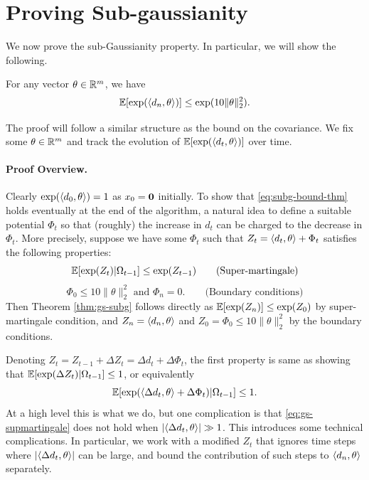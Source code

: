 \section{Proving Sub-gaussianity}

\label{sec:gs-subgaussian}
We now prove the sub-Gaussianity property. In particular, we will show the following.
\begin{theorem}
\label{thm:gs-subg}
For any vector
$\theta \in \mathbb{R}^m$, we have 
\begin{equation}
\label{eq:subg-bound-thm}
    \mathbb{E}[\exp(\langle d_n,\theta\rangle)] \leq \exp(10 \|\theta\|_2^2).
\end{equation}
\end{theorem}


The proof will follow a similar structure as the bound on the covariance. We fix some $\theta \in \mathbb{R}^m$ and track the evolution of $\mathbb{E}[\exp(\langle d_t,\theta\rangle)]$ over time.   

\paragraph{Proof Overview.}
Clearly $\exp(\langle d_0,\theta\rangle)=1$ as $x_0 = \bf{0}$ initially. To show that \eqref{eq:subg-bound-thm} holds eventually at the end of the algorithm,
a natural idea to define a suitable potential $\Phi_t$ so that (roughly) the increase in $d_t$ can be charged to the decrease in $\Phi_t$.
More precisely, 
suppose we have some $\Phi_t$ such that 
$Z_t = \langle d_t,\theta\rangle + \Phi_t$
satisfies the following properties:
 \[ \mathbb{E}[\exp(Z_t)|\Omega_{t-1}] \leq \exp(Z_{t-1}) \qquad \text{(Super-martingale)} \] 
 \[ \Phi_0 \leq  {10\|\theta\|_2^2}  \text{ and  } \Phi_n=0.  \qquad   \text {(Boundary conditions)}\]
Then Theorem \ref{thm:gs-subg} follows directly as $\mathbb{E}[\exp(Z_n)] \leq \exp(Z_0)$ by super-martingale condition, and $Z_n = \langle d_n,\theta\rangle$ and $Z_0 = \Phi_0 \leq 10\|\theta\|_2^2$ by the boundary conditions. 


Denoting $Z_t = Z_{t-1} + \Delta Z_t = \Delta d_t + \Delta\Phi_t$,  the first property is same as showing that
 $\mathbb{E}[\exp(\Delta Z_t)|\Omega_{t-1}] \leq 1$,
 or equivalently
 \begin{equation}
     \label{eq:gs-supmartingale}\mathbb{E}[ \exp(\langle \Delta d_t,\theta\rangle + \Delta \Phi_t) | \Omega_{t-1}]  \leq 1. 
 \end{equation}
At a high level this is what we do, but one complication is that \eqref{eq:gs-supmartingale} does not hold when $|\langle \Delta d_t,\theta\rangle| \gg 1$. 
This introduces some technical complications. In particular, we work with a modified $Z_t$ 
that ignores time steps where $|\langle \Delta d_t,\theta\rangle|$ can be large, and bound the contribution of such steps to $\langle d_n,\theta\rangle$ separately.


